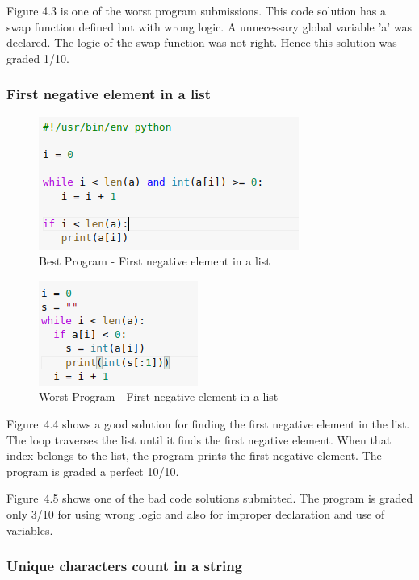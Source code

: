 Figure 4.3 is one of the worst program submissions. This code
solution has a swap function defined but with wrong logic. A
unnecessary global variable 'a' was declared. The logic of
the swap function was not right. Hence this solution was
graded 1/10.

\newpage
\subsubsection{First negative element in a list}

\begin{figure}[h]
\centering
\includegraphics{./figures/best_fn.png}
\caption{Best Program - First negative element in a list}
\label{fig1}
\end{figure}

\begin{figure}[h]
\centering
\includegraphics{./figures/worst_fn.png}
\caption{Worst Program - First negative element in a list}
\label{fig1}
\end{figure}

Figure~4.4 shows a good solution for finding the first
negative element in the list. The loop traverses the list
until it finds the first negative element. When that index
belongs to the list, the program prints the first negative
element. The program is graded a perfect 10/10.

Figure~4.5 shows one of the bad code solutions submitted. The
program is graded only 3/10 for using wrong logic and also
for improper declaration and use of variables.

\newpage

\subsubsection{Unique characters count in a string}

